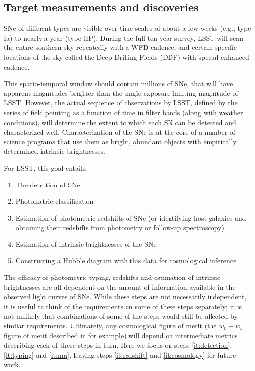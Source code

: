 
\subsection{Target measurements and discoveries}
\label{sec:\secname:targets}

SNe of different types are visible over time scales of about a few
weeks (e.g., type Ia) to nearly a year (type IIP).  During the full
ten-year survey, LSST will scan the entire southern sky repeatedly with
a WFD cadence, and certain specific locations of the sky called the Deep
Drilling Fields (DDF) with special enhanced cadence.

This spatio-temporal window should contain millions
of SNe, that will have apparent magnitudes brighter than the single
exposure limiting magnitude of LSST.  However, the actual sequence of
observations by LSST, defined by the series of field pointing as a
function of time in filter bands (along with weather conditions), will
determine the extent to which each SN can be detected and characterized
well.  Characterization of the SNe is at the core of a number of science
programs that use them as bright, abundant objects with empirically
determined intrinsic brightnesses. 

For LSST, this goal entails: 
\begin{enumerate}
\renewcommand{\theenumi}{\alph{enumi}}
\item The detection of SNe \label{it:detection}
\item Photometric classification \label{it:typing}
\item Estimation of photometric redshifts of SNe (or identifying host galaxies and obtaining their
redshifts from photometry or follow-up spectroscopy) \label{it:redshift}
\item Estimation of intrinsic brightnesses of the SNe \label{it:mu}
\item Constructing a Hubble diagram with this data for cosmological inference \label{it:cosmology}
\end{enumerate}

The efficacy
of photometric typing, redshifts and estimation of intrinsic brightnesses
are all dependent on the amount of information available in the observed
light curves of SNe. While these steps are not necessarily independent, it
is useful to think of the requirements on some of these steps separately;
it is not unlikely  that combinations of some of the steps would still be
affected by similar requirements. Ultimately, any cosmological figure of merit (the $w_0-w_a$ 
figure of merit described in \citet{Albrecht2006} for example) will depend on intermediate metrics 
describing each of these steps in turn. Here we focus on steps \ref{it:detection}, \ref{it:typing} 
and \ref{it:mu}, leaving steps \ref{it:redshift} and \ref{it:cosmology} for future work.

